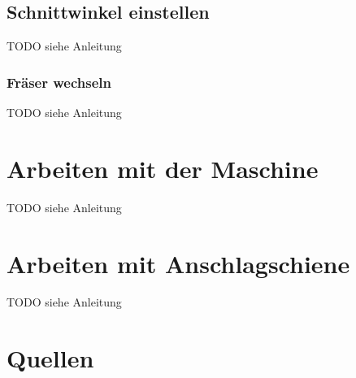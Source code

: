 \documentclass{\basedir/fablab-document}
\begin{document}
\subsection{Schnittwinkel einstellen}
TODO siehe Anleitung

\subsubsection{Fräser wechseln}
TODO siehe Anleitung

\section{Arbeiten mit der Maschine}
TODO siehe Anleitung

\section{Arbeiten mit Anschlagschiene}
TODO siehe Anleitung

\newpage
\section{Quellen}
\end{document}
